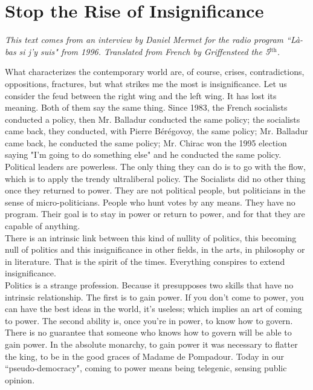 \chapter{Stop the Rise of Insignificance}

\emph{This text comes from an interview by Daniel Mermet for the radio program ``L\`a-bas si j'y suis" from 1996. Translated from French by Griffensteed the 5$^\text{lth}$.\\}

What characterizes the contemporary world are, of course, crises, contradictions, oppositions, fractures, but what strikes me the most is insignificance. Let us consider the feud between the right wing and the left wing. It has lost its meaning. Both of them say the same thing. Since 1983, the French socialists conducted a policy, then Mr. Balladur conducted the same policy; the socialists came back, they conducted, with Pierre Bérégovoy, the same policy; Mr. Balladur came back, he conducted the same policy; Mr. Chirac won the 1995 election saying "I'm going to do something else" and he conducted the same policy.\\
Political leaders are powerless. The only thing they can do is to go with the flow, which is to apply the trendy ultraliberal policy. The Socialists did no other thing once they returned to power. They are not political people, but politicians in the sense of micro-politicians. People who hunt votes by any means. They have no program. Their goal is to stay in power or return to power, and for that they are capable of anything.\\
There is an intrinsic link between this kind of nullity of politics, this becoming null of politics and this insignificance in other fields, in the arts, in philosophy or in literature. That is the spirit of the times. Everything conspires to extend insignificance.\\
Politics is a strange profession. Because it presupposes two skills that have no intrinsic relationship. The first is to gain power. If you don't come to power, you can have the best ideas in the world, it's useless; which implies an art of coming to power. The second ability is, once you're in power, to know how to govern.\\
There is no guarantee that someone who knows how to govern will be able to gain power. In the absolute monarchy, to gain power it was necessary to flatter the king, to be in the good graces of Madame de Pompadour. Today in our ``pseudo-democracy", coming to power means being telegenic, sensing public opinion.\\
